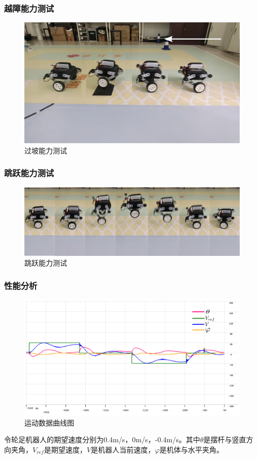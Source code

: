 \documentclass{beamer}
\begin{document}
	
		\begin{frame}
		\frametitle{越障能力测试}
		\begin{figure}
			\centering
			\includegraphics[width=0.9\linewidth]{img/chapter6/2.pdf}
			\captionsetup{font=scriptsize}
			\vspace{5pt}
			\caption{过坡能力测试}
		\end{figure}
	\end{frame}
	
	\begin{frame}
		\frametitle{跳跃能力测试}
		\begin{figure}
			\centering
			\includegraphics[width=0.9\linewidth]{img/chapter6/jump.pdf}
			\captionsetup{font=scriptsize}
			\vspace{5pt}
			\caption{跳跃能力测试}
		\end{figure}
	\end{frame}
	
	
	
	
	\begin{frame}
		\frametitle{性能分析}
		\begin{figure}
			\centering
			\includegraphics[width=0.8\linewidth]{img/chapter6/data.pdf}
			\captionsetup{font=scriptsize}
			\caption{运动数据曲线图}
		\end{figure}
		
		令轮足机器人的期望速度分别为0.4m/s，0m/s，-0.4m/s。其中$\theta$是摆杆与竖直方向夹角，$V_{ref}$是期望速度，$V$是机器人当前速度，$\varphi$是机体与水平夹角。
	\end{frame}
	
\end{document}
